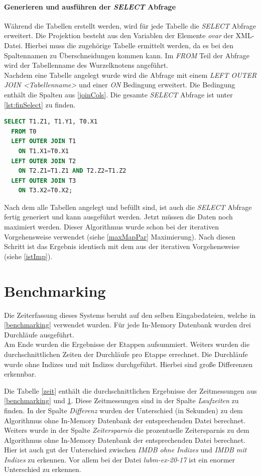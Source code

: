 \documentclass[draft,final]{vutinfth} %
\begin{document}
\paragraph{Generieren und ausführen der \textit{SELECT} Abfrage}
Während die Tabellen erstellt werden, wird für jede Tabelle die \textit{SELECT} Abfrage erweitert. Die Projektion besteht aus den Variablen der Elemente \textit{ovar} der XML-Datei. Hierbei muss die zugehörige Tabelle ermittelt werden, da es bei den Spaltennamen zu Überschneidungen kommen kann. Im \textit{FROM} Teil der Abfrage wird der Tabellenname des Wurzelknotens angeführt. \\
Nachdem eine Tabelle angelegt wurde wird die Abfrage mit einem \textit{LEFT OUTER JOIN <Tabellenname>} und einer \textit{ON} Bedingung erweitert. Die Bedingung enthält die Spalten aus \ref{joinCols}. Die gesamte \textit{SELECT} Abfrage ist unter \ref{lst:finSelect} zu finden.

\begin{lstlisting}[language=SQL,label={lst:finSelect},caption={SELECT Abfrage},frame = single]
SELECT T1.Z1, T1.Y1, T0.X1
  FROM T0
  LEFT OUTER JOIN T1
	ON T1.X1=T0.X1 
  LEFT OUTER JOIN T2
	ON T2.Z1=T1.Z1 AND T2.Z2=T1.Z2 
  LEFT OUTER JOIN T3
	ON T3.X2=T0.X2;
\end{lstlisting}

Nach dem alle Tabellen angelegt und befüllt sind, ist auch die \textit{SELECT} Abfrage fertig generiert und kann ausgeführt werden. Jetzt müssen die Daten noch maximiert werden. Dieser Algorithmus wurde schon bei der iterativen Vorgehensweise verwendet (siehe \ref{maxMapPar} Maximierung). Nach diesen Schritt ist das Ergebnis identisch mit dem aus der iterativen Vorgehensweise (siehe \ref{istImp}).

\section{Benchmarking} \label{benchNeu}
Die Zeiterfassung dieses Systems beruht auf den selben Eingabedateien, welche in \ref{benchmarking} verwendet wurden. Für jede In-Memory Datenbank wurden drei Durchläufe ausgeführt. \\
Am Ende wurden die Ergebnisse der Etappen aufsummiert. Weiters wurden die durchschnittlichen Zeiten der Durchläufe pro Etappe errechnet. Die Durchläufe wurde ohne Indizes und mit Indizes durchgeführt. Hierbei sind gro\ss e Differenzen erkennbar.

Die Tabelle \ref{zeit} enthält die durchschnittlichen Ergebnisse der Zeitmessungen aus \ref{benchmarking} und \ref{benchNeu}. Diese Zeitmessungen sind in der Spalte \textit{Laufzeiten} zu finden. In der Spalte \textit{Differenz} wurden der Unterschied (in Sekunden) zu dem Algorithmus ohne In-Memory Datenbank der entsprechenden Datei berechnet. Weiters wurde in der Spalte \textit{Zeitersparnis} die prozentuelle Zeitersparnis zu dem Algorithmus ohne In-Memory Datenbank der entsprechenden Datei berechnet. \\
Hier ist auch gut der Unterschied zwischen \textit{IMDB ohne Indizes} und \textit{IMDB mit Indizes} zu erkennen. Vor allem bei der Datei \textit{lubm-ex-20-17} ist ein enormer Unterschied zu erkennen.
\end{document}

